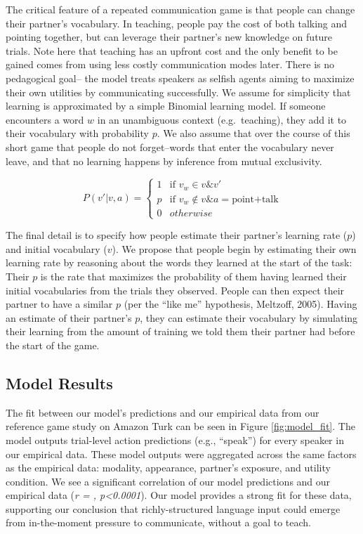 \documentclass[english,,man,floatsintext]{apa6}
\begin{document}
The critical feature of a repeated communication game is that people can change their partner's vocabulary. In teaching, people pay the cost of both talking and pointing together, but can leverage their partner's new knowledge on future trials. Note here that teaching has an upfront cost and the only benefit to be gained comes from using less costly communication modes later. There is no pedagogical goal-- the model treats speakers as selfish agents aiming to maximize their own utilities by communicating successfully. We assume for simplicity that learning is approximated by a simple Binomial learning model. If someone encounters a word \(w\) in an unambiguous context (e.g.~teaching), they add it to their vocabulary with probability \(p\). We also assume that over the course of this short game that people do not forget--words that enter the vocabulary never leave, and that no learning happens by inference from mutual exclusivity.

\[
P\left(v'|v,a\right)= \begin{cases} 
1 & \text{if } v_{w} \in v \& v'\\ 
p & \text{if } v_{w} \notin v \& a = \text{point+talk}\\ 
0 & otherwise\end{cases}
\]

The final detail is to specify how people estimate their partner's learning rate (\(p\)) and initial vocabulary (\(v\)). We propose that people begin by estimating their own learning rate by reasoning about the words they learned at the start of the task: Their \(p\) is the rate that maximizes the probability of them having learned their initial vocabularies from the trials they observed. People can then expect their partner to have a similar \(p\) (per the ``like me'' hypothesis, Meltzoff, 2005). Having an estimate of their partner's \(p\), they can estimate their vocabulary by simulating their learning from the amount of training we told them their partner had before the start of the game.

\hypertarget{model-results}{%
\subsection{Model Results}\label{model-results}}

The fit between our model's predictions and our empirical data from our reference game study on Amazon Turk can be seen in Figure \ref{fig:model_fit}. The model outputs trial-level action predictions (e.g., \enquote{speak}) for every speaker in our empirical data. These model outputs were aggregated across the same factors as the empirical data: modality, appearance, partner's exposure, and utility condition. We see a significant correlation of our model predictions and our empirical data (\emph{r = , p\textless{}0.0001}). Our model provides a strong fit for these data, supporting our conclusion that richly-structured language input could emerge from in-the-moment pressure to communicate, without a goal to teach.
\end{document}
